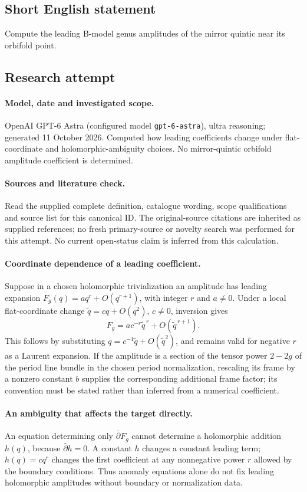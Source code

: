 \documentclass[11pt]{article}
\begin{document}
\subsection{Short English statement}
Compute the leading B-model genus amplitudes of the mirror quintic near its orbifold point.
\subsection{Research attempt}
\paragraph{Model, date and investigated scope.}
OpenAI GPT-6 Astra (configured model \texttt{gpt-6-astra}), ultra reasoning; generated 11 October 2026. Computed how leading coefficients change under flat-coordinate and holomorphic-ambiguity choices. No mirror-quintic orbifold amplitude coefficient is determined.

\paragraph{Sources and literature check.}
Read the supplied complete definition, catalogue wording, scope qualifications and source list for this canonical ID. The original-source citations are inherited as supplied references; no fresh primary-source or novelty search was performed for this attempt. No current open-status claim is inferred from this calculation.

\paragraph{Coordinate dependence of a leading coefficient.}Suppose in a chosen holomorphic trivialization an amplitude has leading expansion \(F_g(q)=a q^r+O(q^{r+1})\), with integer \(r\) and \(a\ne0\). Under a local flat-coordinate change \(\widetilde q=cq+O(q^2)\), \(c\ne0\), inversion gives
\[F_g=a c^{-r}\widetilde q^{\,r}+O(\widetilde q^{\,r+1}).\]
This follows by substituting \(q=c^{-1}\widetilde q+O(\widetilde q^2)\), and remains valid for negative \(r\) as a Laurent expansion. If the amplitude is a section of the tensor power \(2-2g\) of the period line bundle in the chosen period normalization, rescaling its frame by a nonzero constant \(b\) supplies the corresponding additional frame factor; its convention must be stated rather than inferred from a numerical coefficient.
\paragraph{An ambiguity that affects the target directly.}An equation determining only \(\bar\partial F_g\) cannot determine a holomorphic addition \(h(q)\), because \(\bar\partial h=0\). A constant \(h\) changes a constant leading term; \(h(q)=cq^r\) changes the first coefficient at any nonnegative power \(r\) allowed by the boundary conditions. Thus anomaly equations alone do not fix leading holomorphic amplitudes without boundary or normalization data.
\end{document}
